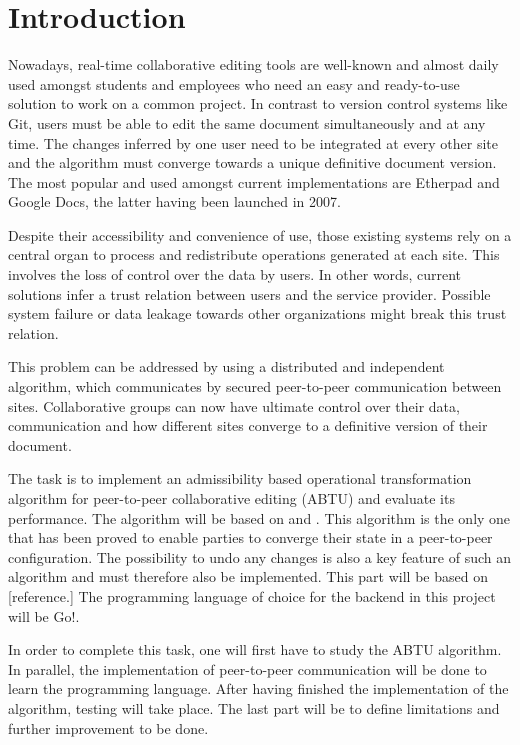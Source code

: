 \documentclass[11pt, a4paper, oneside, openright]{article} %
\begin{document}

\pagebreak
\pagestyle{empty}
\listoffigures

\pagebreak
\tableofcontents

\pagebreak

\pagestyle{plain}
\section{Introduction}
\setcounter{page}{1}

Nowadays, real-time collaborative editing tools are well-known and almost daily used amongst students and employees who need an easy and ready-to-use solution to work on a common project. In contrast to version control systems like Git, users must be able to edit the same document simultaneously and at any time. The changes inferred by one user need to be integrated at every other site and the algorithm must converge towards a unique definitive document version. The most popular and used amongst current implementations are Etherpad and Google Docs, the latter having been launched in 2007.

Despite their accessibility and convenience of use, those existing systems rely on a central organ to process and redistribute operations generated at each site. This involves the loss of control over the data by users. In other words, current solutions infer a trust relation between users and the service provider. Possible system failure or data leakage towards other organizations might break this trust relation. 

This problem can be addressed by using a distributed and independent algorithm, which communicates by secured peer-to-peer communication between sites. Collaborative groups can now have ultimate control over their data, communication and how different sites converge to a definitive version of their document.

The task is to implement an admissibility based operational transformation algorithm for peer-to-peer collaborative editing (ABTU) and evaluate its performance.
The algorithm will be based on \cite{abtu} and \cite{abtuu}. This algorithm is the only one that has been proved to enable parties to converge their state in a peer-to-peer configuration. The possibility to undo any changes is also a key feature of such an algorithm and must therefore also be implemented. This part will be based on [reference.] The programming language of choice for the backend in this project will be Go!.

In order to complete this task, one will first have to study the ABTU algorithm. In parallel, the implementation of peer-to-peer communication will be done to learn the programming language. After having finished the implementation of the algorithm, testing will take place. The last part will be to define limitations and further improvement to be done.
\end{document}
